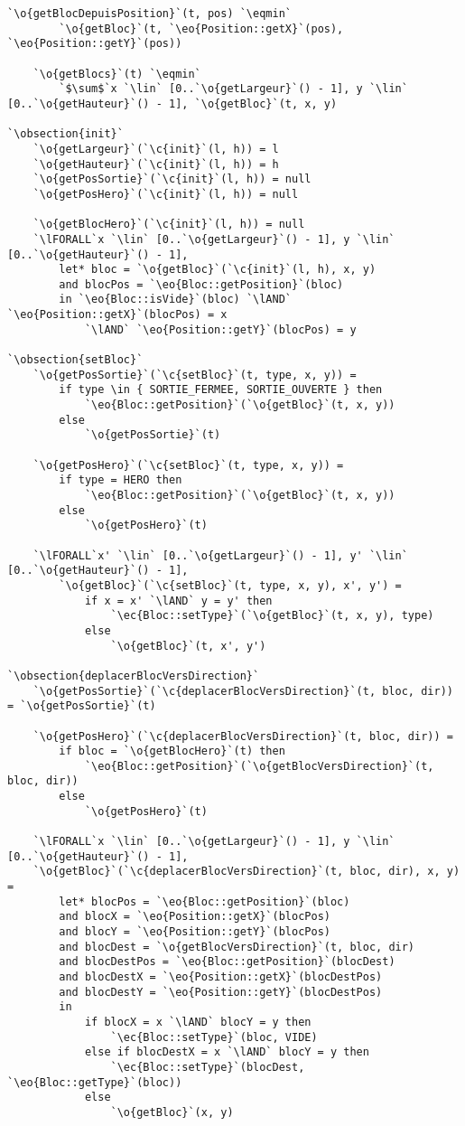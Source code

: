 \documentclass{article}
\newcommand{\eqmin}{$\overset{min}{=}$}
\newcommand{\lAND}{$\land$}
\newcommand{\lFORALL}{$\forall$}
\newcommand{\lin}{$\in$}
\newcommand{\obsection}[1]{\textbf{[#1]}}
\renewcommand{\o}[1]{\textcolor{blue}{#1}}
\renewcommand{\c}[1]{\textcolor{red}{#1}}
\newcommand{\eo}[1]{\textcolor{RoyalPurple}{#1}}
\newcommand{\ec}[1]{\textcolor{BrickRed}{#1}}
\begin{document}
\begin{lstlisting}[caption=Terrain]
	`\o{getBlocDepuisPosition}`(t, pos) `\eqmin`
		`\o{getBloc}`(t, `\eo{Position::getX}`(pos), `\eo{Position::getY}`(pos))
	
	`\o{getBlocs}`(t) `\eqmin`
		`$\sum$`x `\lin` [0..`\o{getLargeur}`() - 1], y `\lin` [0..`\o{getHauteur}`() - 1], `\o{getBloc}`(t, x, y) 

`\obsection{init}`
	`\o{getLargeur}`(`\c{init}`(l, h)) = l
	`\o{getHauteur}`(`\c{init}`(l, h)) = h
	`\o{getPosSortie}`(`\c{init}`(l, h)) = null
	`\o{getPosHero}`(`\c{init}`(l, h)) = null
	
	`\o{getBlocHero}`(`\c{init}`(l, h)) = null
	`\lFORALL`x `\lin` [0..`\o{getLargeur}`() - 1], y `\lin` [0..`\o{getHauteur}`() - 1],
		let* bloc = `\o{getBloc}`(`\c{init}`(l, h), x, y)
		and blocPos = `\eo{Bloc::getPosition}`(bloc)
		in `\eo{Bloc::isVide}`(bloc) `\lAND` `\eo{Position::getX}`(blocPos) = x
			`\lAND` `\eo{Position::getY}`(blocPos) = y

`\obsection{setBloc}`
	`\o{getPosSortie}`(`\c{setBloc}`(t, type, x, y)) =
		if type \in { SORTIE_FERMEE, SORTIE_OUVERTE } then
			`\eo{Bloc::getPosition}`(`\o{getBloc}`(t, x, y))
		else
			`\o{getPosSortie}`(t)
			
	`\o{getPosHero}`(`\c{setBloc}`(t, type, x, y)) =
		if type = HERO then
			`\eo{Bloc::getPosition}`(`\o{getBloc}`(t, x, y))
		else
			`\o{getPosHero}`(t)
			
	`\lFORALL`x' `\lin` [0..`\o{getLargeur}`() - 1], y' `\lin` [0..`\o{getHauteur}`() - 1],
		`\o{getBloc}`(`\c{setBloc}`(t, type, x, y), x', y') =
			if x = x' `\lAND` y = y' then
				`\ec{Bloc::setType}`(`\o{getBloc}`(t, x, y), type)
			else
				`\o{getBloc}`(t, x', y')

`\obsection{deplacerBlocVersDirection}`
	`\o{getPosSortie}`(`\c{deplacerBlocVersDirection}`(t, bloc, dir)) = `\o{getPosSortie}`(t)
	
	`\o{getPosHero}`(`\c{deplacerBlocVersDirection}`(t, bloc, dir)) =
		if bloc = `\o{getBlocHero}`(t) then
			`\eo{Bloc::getPosition}`(`\o{getBlocVersDirection}`(t, bloc, dir))
		else
			`\o{getPosHero}`(t)
			
	`\lFORALL`x `\lin` [0..`\o{getLargeur}`() - 1], y `\lin` [0..`\o{getHauteur}`() - 1],
	`\o{getBloc}`(`\c{deplacerBlocVersDirection}`(t, bloc, dir), x, y) =
		let* blocPos = `\eo{Bloc::getPosition}`(bloc)
		and blocX = `\eo{Position::getX}`(blocPos)
		and blocY = `\eo{Position::getY}`(blocPos)
		and blocDest = `\o{getBlocVersDirection}`(t, bloc, dir)
		and blocDestPos = `\eo{Bloc::getPosition}`(blocDest)
		and blocDestX = `\eo{Position::getX}`(blocDestPos)
		and blocDestY = `\eo{Position::getY}`(blocDestPos)
		in
			if blocX = x `\lAND` blocY = y then
				`\ec{Bloc::setType}`(bloc, VIDE)
			else if blocDestX = x `\lAND` blocY = y then
				`\ec{Bloc::setType}`(blocDest, `\eo{Bloc::getType}`(bloc))
			else
				`\o{getBloc}`(x, y)
			

\end{lstlisting}
\end{document}
